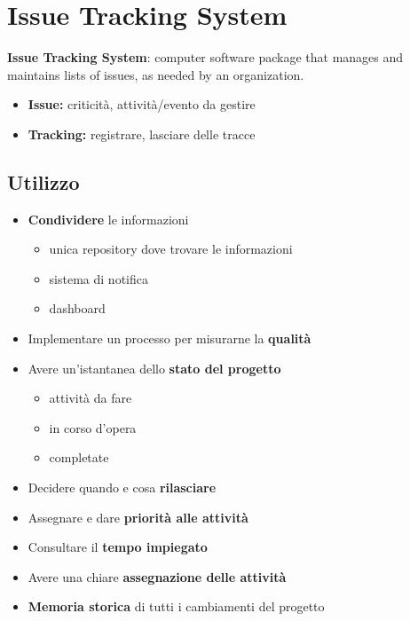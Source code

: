\section{Issue Tracking System}

\begin{mdframed}
    \textbf{Issue Tracking System}: computer software package that manages and maintains lists of issues, as needed by an organization.
\end{mdframed}
\begin{itemize}
    \item \textbf{Issue:} criticità, attività/evento da gestire
    \item \textbf{Tracking:} registrare, lasciare delle tracce
\end{itemize}

\subsection{Utilizzo}
\begin{itemize}
    \item \textbf{Condividere} le informazioni
    \begin{itemize}
        \item unica repository dove trovare le informazioni
        \item sistema di notifica
        \item dashboard
    \end{itemize}
    \item Implementare un processo per misurarne la \textbf{qualità}
    \item Avere un'istantanea dello \textbf{stato del progetto}
    \begin{itemize}
        \item attività da fare
        \item in corso d'opera
        \item completate
    \end{itemize}
    \item Decidere quando e cosa \textbf{rilasciare}
    \item Assegnare e dare \textbf{priorità alle attività}
    \item Consultare il \textbf{tempo impiegato}
    \item Avere una chiare \textbf{assegnazione delle attività}
    \item \textbf{Memoria storica} di tutti i cambiamenti del progetto
\end{itemize}

